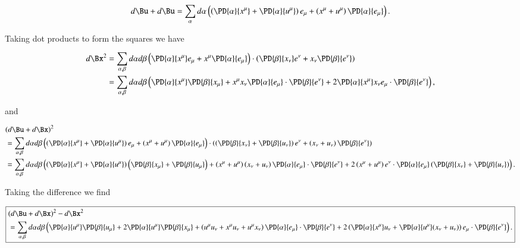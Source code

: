 \begin{equation}\label{eqn:continuumL2:590}
d\Bu + d\Bu 
= 
\sum_\alpha
d\alpha \left( 
\left(
\PD{\alpha}{x^\mu} 
+
\PD{\alpha}{u^\mu} 
\right)
e_\mu
+
\left(
x^\mu
+
u^\mu
\right)
\PD{\alpha}{e_\mu} 
\right).
\end{equation}

Taking dot products to form the squares we have

\begin{align*}
d\Bx^2 
&= 
\sum_{\alpha, \beta} 
d\alpha 
d\beta 
\left( 
\PD{\alpha}{x^\mu} e_\mu
+
x^\mu
\PD{\alpha}{e_\mu} 
\right)
\cdot
\left( 
\PD{\beta}{x_\nu} e^\nu
+
x_\nu
\PD{\beta}{e^\nu} 
\right) 
\\
&=
\sum_{\alpha, \beta} 
d\alpha 
d\beta 
\left( 
\PD{\alpha}{x^\mu} \PD{\beta}{x_\mu} 
+
x^\mu x_\nu
\PD{\alpha}{e_\mu} 
\cdot
\PD{\beta}{e^\nu} 
+ 
2 \PD{\alpha}{x^\mu} 
x_\nu
e_\mu \cdot
\PD{\beta}{e^\nu} 
\right),
\end{align*}

and

\begin{align*}
&(d\Bu + d\Bx)^2 \\
&= 
\sum_{\alpha, \beta}
d\alpha 
d\beta 
\left( 
\left(
\PD{\alpha}{x^\mu} 
+
\PD{\alpha}{u^\mu} 
\right)
e_\mu
+
\left(
x^\mu
+
u^\mu
\right)
\PD{\alpha}{e_\mu} 
\right)
\cdot
\left( 
\left(
\PD{\beta}{x_\nu} 
+
\PD{\beta}{u_\nu} 
\right)
e^\nu
+
\left(
x_\nu
+
u_\nu
\right)
\PD{\beta}{e^\nu} 
\right) \\
&= 
\sum_{\alpha, \beta}
d\alpha 
d\beta 
\left(
\left(
\PD{\alpha}{x^\mu} 
+
\PD{\alpha}{u^\mu} 
\right)
\left(
\PD{\beta}{x_\mu} 
+
\PD{\beta}{u_\mu} 
\right)
+
\left(
x^\mu
+
u^\mu
\right)
\left(
x_\nu
+
u_\nu
\right)
\PD{\alpha}{e_\mu} 
\cdot
\PD{\beta}{e^\nu} 
+
2
\left(
x^\mu
+
u^\mu
\right)
e^\nu
\cdot
\PD{\alpha}{e_\mu} 
\left(
\PD{\beta}{x_\nu} 
+
\PD{\beta}{u_\nu} 
\right)
\right).
\end{align*}

Taking the difference we find

\begin{equation}\label{eqn:continuumL2:610}
\boxed{
\begin{aligned}
&(d\Bu + d\Bx)^2 - d\Bx^2 \\
&=
\sum_{\alpha, \beta}
d\alpha 
d\beta 
\left( 
\PD{\alpha}{u^\mu} 
\PD{\beta}{u_\mu} 
+
2
\PD{\alpha}{u^\mu} 
\PD{\beta}{x_\mu} 
+ 
\left(
u^\mu u_\nu 
+
x^\mu u_\nu 
+
u^\mu x_\nu 
\right)
\PD{\alpha}{e_\mu}
\cdot
\PD{\beta}{e^\nu} 
+
2 
\left(
\PD{\alpha}{x^\mu}
u_\nu
+
\PD{\alpha}{u^\mu}(
x_\nu
+
u_\nu
)
\right)
e_\mu \cdot 
\PD{\beta}{e^\nu}
\right).
\end{aligned}
}
\end{equation}

